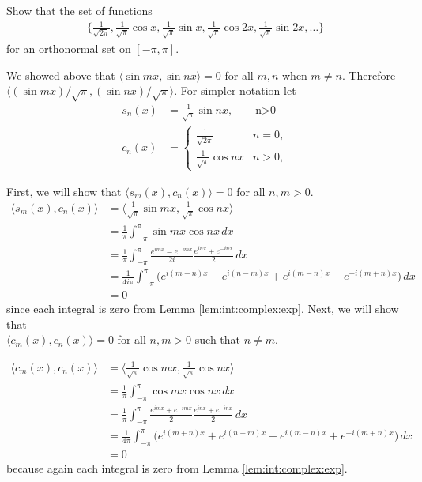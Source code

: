 \begin{example} \label{ex:trig:ortho:set}
Show that the set of functions 
% 
\begin{align*}
\biggl\{ \frac{1}{\sqrt{2\pi}}, \frac{1}{\sqrt{\pi}} \cos x , \frac{1}{\sqrt{\pi}} \sin x, \frac{1}{\sqrt{\pi}} \cos 2x, \frac{1}{\sqrt{\pi}} \sin 2x, \ldots  \biggr\}
\end{align*}
for an orthonormal set on $[-\pi,\pi]$.  


\solution

We showed above that $\langle \sin mx, \sin nx \rangle=0$ for all $m,n$ when $m \neq n$.   Therefore $\langle (\sin mx)/\sqrt{\pi}, (\sin nx)/\sqrt{\pi} \rangle$.   For simpler notation let
%
\begin{align*}
s_n(x) & = \frac{1}{\sqrt{\pi}}\sin n x, \qquad \text{n>0} \\
c_n(x) & = \begin{cases} 
\frac{1}{\sqrt{2\pi}} & n = 0, \\
\frac{1}{\sqrt{\pi}} \cos nx  & n>0,
\end{cases}
\end{align*}

First, we will show that $\langle s_m (x), c_n(x) \rangle=0$ for all $n, m>0$.  
\begin{align*}
\langle s_m (x), c_n (x) \rangle & = 
\biggl\langle \frac{1}{\sqrt{\pi}}\sin mx, \frac{1}{\sqrt{\pi}}\cos nx  \biggr\rangle \\
&  = \frac{1}{\pi} \int_{-\pi}^{\pi} \sin mx  \cos nx \,dx \\
& = \frac{1}{\pi} \int_{-\pi}^{\pi} \frac{e^{imx} - e^{-imx}}{2i} \frac{e^{inx}+e^{-inx}}{2} \, dx \\
& = \frac{1}{4i\pi} \int_{-\pi}^{\pi} \bigl( e^{i(m+n)x}-e^{i(n-m)x}+e^{i(m-n)x}-e^{-i(m+n)x} \bigr) \, dx  \\ &  = 0 
\end{align*}
since each integral is zero from Lemma \ref{lem:int:complex:exp}.  Next, we will show that\\ $\langle c_m(x), c_n(x) \rangle = 0$ for all $n,m >0$ such that $n \neq m$. 

\begin{align*}
\langle c_m (x), c_n (x) \rangle & = 
\biggl\langle \frac{1}{\sqrt{\pi}}\cos mx, \frac{1}{\sqrt{\pi}}\cos nx  \biggr\rangle \\
&  = \frac{1}{\pi} \int_{-\pi}^{\pi} \cos mx  \cos nx \,dx \\
& = \frac{1}{\pi} \int_{-\pi}^{\pi} \frac{e^{imx} + e^{-imx}}{2} \frac{e^{inx}+e^{-inx}}{2} \, dx \\
& = \frac{1}{4\pi} \int_{-\pi}^{\pi} \bigl( e^{i(m+n)x} +e^{i(n-m)x}+e^{i(m-n)x}+e^{-i(m+n)x} \bigr) \, dx   \\ &= 0 
\end{align*}
because again each integral is zero from Lemma \ref{lem:int:complex:exp}. 



\end{example}
